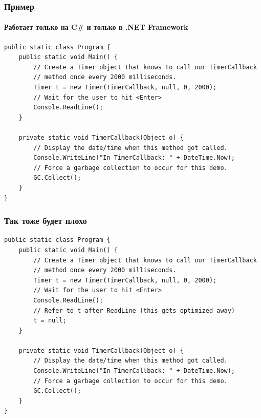 \documentclass[xetex,mathserif,serif]{beamer}
\begin{document}
    \begin{frame}[fragile]
        \frametitle{Пример}
        \framesubtitle{Работает только на C\# и только в .NET Framework}
        \begin{footnotesize}
            \begin{verbatim}
public static class Program {
    public static void Main() {
        // Create a Timer object that knows to call our TimerCallback
        // method once every 2000 milliseconds.
        Timer t = new Timer(TimerCallback, null, 0, 2000);
        // Wait for the user to hit <Enter>
        Console.ReadLine();
    }

    private static void TimerCallback(Object o) {
        // Display the date/time when this method got called.
        Console.WriteLine("In TimerCallback: " + DateTime.Now);
        // Force a garbage collection to occur for this demo.
        GC.Collect();
    }
}
            \end{verbatim}
        \end{footnotesize}
    \end{frame}

    \begin{frame}[fragile]
        \frametitle{Так тоже будет плохо}
        \begin{footnotesize}
            \begin{verbatim}
public static class Program {
    public static void Main() {
        // Create a Timer object that knows to call our TimerCallback
        // method once every 2000 milliseconds.
        Timer t = new Timer(TimerCallback, null, 0, 2000);
        // Wait for the user to hit <Enter>
        Console.ReadLine();
        // Refer to t after ReadLine (this gets optimized away)
        t = null;
    }

    private static void TimerCallback(Object o) {
        // Display the date/time when this method got called.
        Console.WriteLine("In TimerCallback: " + DateTime.Now);
        // Force a garbage collection to occur for this demo.
        GC.Collect();
    }
}
            \end{verbatim}
        \end{footnotesize}
    \end{frame}
\end{document}
